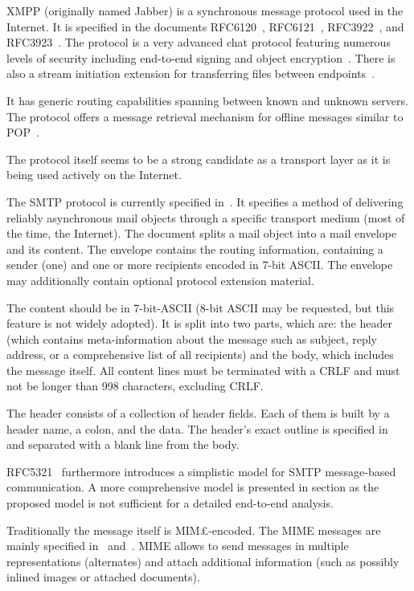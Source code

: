 XMPP (originally named Jabber) is a synchronous message protocol used in the Internet. It is specified in the documents RFC6120~\cite{rfc6120}, RFC6121~\cite{rfc6121}, RFC3922~\cite{rfc3922}, and RFC3923~\cite{rfc3923}. The protocol is a very advanced chat protocol featuring numerous levels of security including end-to-end signing and object encryption~\cite{rfc3923}. There is also a stream initiation extension for transferring files between endpoints~\cite{xep0096}.

It has generic routing capabilities spanning between known and unknown servers. The protocol offers a message retrieval mechanism for offline messages similar to POP~\cite{xep0013}.

The protocol itself seems to be a strong candidate as a transport layer as it is being used actively on the Internet.

The SMTP protocol is currently specified in~\cite{rfc5321}. It specifies a method of delivering reliably asynchronous mail objects through a specific transport medium (most of the time, the Internet). The document splits a mail object into a mail envelope and its content. The envelope contains the routing information, containing a sender (one) and one or more recipients encoded in 7-bit ASCII. The envelope may additionally contain optional protocol extension material. 

The content should be in 7-bit-ASCII (8-bit ASCII may be requested, but this feature is not widely adopted). It is split into two parts, which are: the header (which contains meta-information about the message such as subject, reply address, or a comprehensive list of all recipients) and the body, which includes the message itself. All content lines must be terminated with a CRLF and must not be longer than 998 characters, excluding CRLF.

The header consists of a collection of header fields. Each of them is built by a header name, a colon, and the data. The header's exact outline is specified in~\cite{rfc5322} and separated with a blank line from the body. 

RFC5321~\cite{rfc5321} furthermore introduces a simplistic model for SMTP message-based communication. A more comprehensive model is presented in section  as the proposed model is not sufficient for a detailed end-to-end analysis.

Traditionally the message itself is MIM£-encoded. The MIME messages are mainly specified in~\cite{rfc2045} and~\cite{rfc2046}. MIME allows to send messages in multiple representations (alternates) and attach additional information (such as possibly inlined images or attached documents). 

